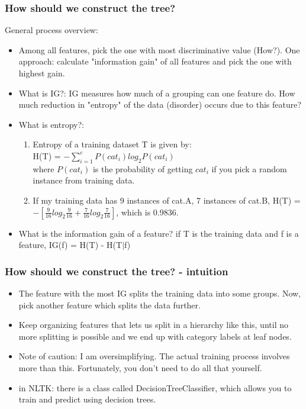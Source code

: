 \documentclass{beamer}
\begin{document}
\begin{frame}
\frametitle{How should we construct the tree?}
General process overview:
\begin{itemize}
\item Among all features, pick the one with most discriminative value (How?). \pause One approach: calculate "information gain" of all features and pick the one with highest gain. 
\item What is IG?: IG measures how much of a grouping can one feature do. How much reduction in "entropy" of the data (disorder) occurs due to this feature? \pause
\item What is entropy?: 
\begin{enumerate}
\item Entropy of a training dataset T is given by: \\ H(T) = $-\sum_{i=1}^c P(cat_i)log_2 P(cat_i)$ \\ where $P(cat_i)$ is the probability of getting $cat_i$ if you pick a random instance from training data.
\item If my training data has 9 instances of cat.A, 7 instances of cat.B, H(T) = $-[\frac{9}{16}log_2\frac{9}{16} + \frac{7}{16}log_2\frac{7}{16} ]$, which is 0.9836.
\end{enumerate}
\item What is the information gain of a feature? if T is the training data and f is a feature, IG(f) = H(T) - H(T$|$f) 
\end{itemize}
\end{frame}


\begin{frame}
\frametitle{How should we construct the tree? - intuition}
\begin{itemize}
\item The feature with the most IG splits the training data into some groups. Now, pick another feature which splits the data further. 
\item Keep organizing features that lets us split in a hierarchy like this, until no more splitting is possible and we end up with category labels at leaf nodes.
\pause 
\item Note of caution: I am oversimplifying. The actual training process involves more than this. Fortunately, you don't need to do all that yourself.
\item in NLTK: there is a class called DecisionTreeClassifier, which allows you to train and predict using decision trees.
\end{itemize}
\end{frame}
\end{document}
